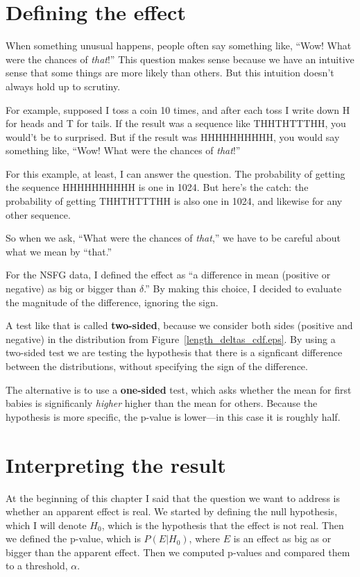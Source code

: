 \documentclass[10pt]{book}
\begin{document}
\section{Defining the effect}

When something unusual happens, people often say something
like, ``Wow!  What were the chances of {\em that}!''  This question
makes sense because we have an intuitive sense that some things
are more likely than others.  But this intuition doesn't
always hold up to scrutiny.

For example, supposed I toss a coin 10 times, and after each toss I
write down H for heads and T for tails.  If the result was a sequence
like THHTHTTTHH, you would't be to surprised.  But if the result was
HHHHHHHHHH, you would say something like, ``Wow!  What were the
chances of {\em that}!''

For this example, at least, I can answer the question.  The
probability of getting the sequence HHHHHHHHHH is one in 1024.  But
here's the catch: the probability of getting THHTHTTTHH is also one in
1024, and likewise for any other sequence.

So when we ask, ``What were the chances of {\em that},'' we have
to be careful about what we mean by ``that.''

For the NSFG data, I defined the effect as ``a difference in mean
(positive or negative) as big or bigger than $\delta$.''  By making
this choice, I decided to evaluate the magnitude of the difference,
ignoring the sign.

A test like that is called {\bf two-sided}, because we consider both
sides (positive and negative) in the distribution from
Figure~\ref{length_deltas_cdf.eps}.  By using a two-sided test we are
testing the hypothesis that there is a signficant difference between
the distributions, without specifying the sign of the difference.

The alternative is to use a {\bf one-sided} test, which asks whether
the mean for first babies is significanly {\em higher} higher than
the mean for others.  Because the hypothesis is more specific, the
p-value is lower---in this case it is roughly half.


\section{Interpreting the result}

At the beginning of this chapter I said that the question we want to
address is whether an apparent effect is real.  We started by defining
the null hypothesis, which I will denote $H_0$, which is the
hypothesis that the effect is not real.  Then we defined the p-value,
which is $P(E | H_0)$, where $E$ is an effect as big as or bigger than
the apparent effect.  Then we computed p-values and compared
them to a threshold, $\alpha$.
\end{document}
